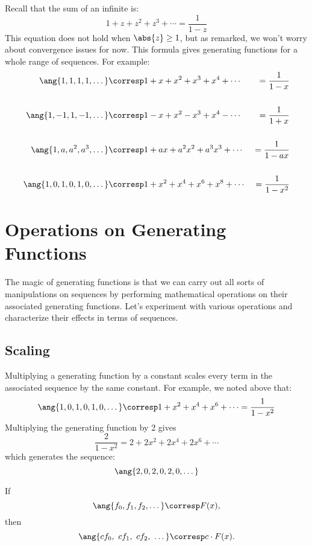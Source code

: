 Recall that the sum of an infinite  is:
%
\[
1 + z + z^2 + z^3 + \cdots = \frac{1}{1 - z}
\]
%
This equation does not hold when $\abs{z} \geq 1$, but as remarked, we
won't worry about convergence issues for now.  This formula gives
 generating functions for a whole range of sequences.
For example:
%
\begin{alignat*}{3}
\ang{1, 1, 1, 1, \dots}
    & \corresp 1 + x + x^2 + x^3 + x^4 + \cdots
    & {}= \dfrac{1}{1-x} \\
\\
\ang{1, -1, 1, -1, \dots}
    & \corresp 1 - x + x^2 - x^3 + x^4 - \cdots
    &  {}= \dfrac{1}{1+x} \\
\\
\ang{1, a, a^2, a^3, \dots}
    & \corresp 1 + a x + a^2 x^2 + a^3 x^3 + \cdots
    &  {}= \dfrac{1}{1-ax} \\
\\
\ang{1, 0, 1, 0, 1, 0, \dots}
    & \corresp 1 + x^2 + x^4 + x^6 + x^8 + \cdots
    & {}= \dfrac{1}{1 - x^2}
\end{alignat*}

\section{Operations on Generating Functions}

The magic of generating functions is that we can carry out all sorts
of manipulations on sequences by performing mathematical operations on
their associated generating functions.  Let's experiment with various
operations and characterize their effects in terms of sequences.

\subsection{Scaling}

Multiplying a generating function by a constant scales every term in
the associated sequence by the same constant.  For example, we noted
above that:
%
\[
\ang{1, 0, 1, 0, 1, 0, \dots}
    \corresp 1 + x^2 + x^4 + x^6 + \cdots = \frac{1}{1 - x^2}
\]
%
Multiplying the generating function by 2 gives
%
\[
\frac{2}{1 - x^2} = 2 + 2 x^2 + 2 x^4 + 2 x^6 + \cdots
\]
%
which generates the sequence:
%
\[
\ang{2, 0, 2, 0, 2, 0, \dots}
\]

\begin{rul}
\label{rule:scaling}
If
\[\ang{f_0, f_1, f_2, \dots} \corresp F(x),\]
then
%
\[
\ang{c f_0,\ c f_1,\ c f_2,\ \dots} \corresp c \cdot F(x).
\]
\end{rul}

